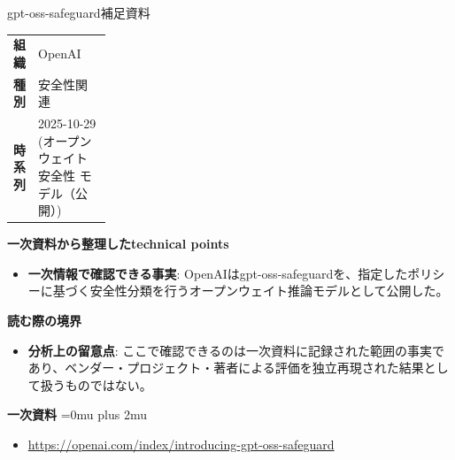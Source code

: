 \begin{technicalnote}{gpt-oss-safeguard}{補足資料}
\begingroup
\begin{tabularx}{\linewidth}{@{}>{\bfseries}p{0.22\linewidth}X@{}}
組織 & OpenAI \\
種別 & 安全性関連 \\
時系列 & 2025-10-29 (オープンウェイト 安全性 モデル（公開）) \\
\end{tabularx}
\smallskip
{\bfseries 一次資料から整理したtechnical points}
\begin{itemize}[leftmargin=1.5em,itemsep=0.35em]
\item \textbf{一次情報で確認できる事実}: OpenAIはgpt-oss-safeguardを、指定したポリシーに基づく安全性分類を行うオープンウェイト推論モデルとして公開した。
\end{itemize}
\begin{minipage}{\linewidth}
{\bfseries 読む際の境界}
\begin{itemize}[leftmargin=1.5em,itemsep=0.35em]
\item \textbf{分析上の留意点}: ここで確認できるのは一次資料に記録された範囲の事実であり、ベンダー・プロジェクト・著者による評価を独立再現された結果として扱うものではない。
\end{itemize}
\begin{samepage}
{\bfseries 一次資料}
\begingroup\sloppy
\Urlmuskip=0mu plus 2mu\relax
\begin{itemize}[leftmargin=1.5em,itemsep=0.25em]
\item {\scriptsize\url{https://openai.com/index/introducing-gpt-oss-safeguard}}
\end{itemize}
\endgroup
\end{samepage}
\end{minipage}
\endgroup
\end{technicalnote}
\medskip

